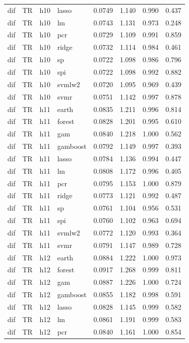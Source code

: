 \begin{ThreePartTable}
\begin{longtable}[t]{llclcccc}
dif & TR & h10 & lasso & 0.0749 & 1.140 & 0.990 & 0.437\\
dif & TR & h10 & lm & 0.0743 & 1.131 & 0.973 & 0.248\\
dif & TR & h10 & pcr & 0.0729 & 1.109 & 0.991 & 0.859\\
dif & TR & h10 & ridge & 0.0732 & 1.114 & 0.984 & 0.461\\
dif & TR & h10 & sp & 0.0722 & 1.098 & 0.986 & 0.796\\
dif & TR & h10 & spi & 0.0722 & 1.098 & 0.992 & 0.882\\
dif & TR & h10 & svmlw2 & 0.0720 & 1.095 & 0.969 & 0.439\\
dif & TR & h10 & svmr & 0.0751 & 1.142 & 0.997 & 0.878\\
\addlinespace
dif & TR & h11 & earth & 0.0835 & 1.211 & 0.996 & 0.814\\
dif & TR & h11 & forest & 0.0828 & 1.201 & 0.995 & 0.610\\
dif & TR & h11 & gam & 0.0840 & 1.218 & 1.000 & 0.562\\
dif & TR & h11 & gamboost & 0.0792 & 1.149 & 0.997 & 0.393\\
dif & TR & h11 & lasso & 0.0784 & 1.136 & 0.994 & 0.447\\
dif & TR & h11 & lm & 0.0808 & 1.172 & 0.996 & 0.405\\
dif & TR & h11 & pcr & 0.0795 & 1.153 & 1.000 & 0.879\\
dif & TR & h11 & ridge & 0.0773 & 1.121 & 0.992 & 0.487\\
dif & TR & h11 & sp & 0.0761 & 1.104 & 0.956 & 0.531\\
dif & TR & h11 & spi & 0.0760 & 1.102 & 0.963 & 0.694\\
dif & TR & h11 & svmlw2 & 0.0772 & 1.120 & 0.993 & 0.364\\
dif & TR & h11 & svmr & 0.0791 & 1.147 & 0.989 & 0.728\\
\addlinespace
dif & TR & h12 & earth & 0.0884 & 1.222 & 1.000 & 0.973\\
dif & TR & h12 & forest & 0.0917 & 1.268 & 0.999 & 0.811\\
dif & TR & h12 & gam & 0.0887 & 1.226 & 1.000 & 0.724\\
dif & TR & h12 & gamboost & 0.0855 & 1.182 & 0.998 & 0.591\\
dif & TR & h12 & lasso & 0.0828 & 1.145 & 0.999 & 0.582\\
dif & TR & h12 & lm & 0.0861 & 1.191 & 0.999 & 0.583\\
dif & TR & h12 & pcr & 0.0840 & 1.161 & 1.000 & 0.854\\

\end{longtable}
\end{ThreePartTable}
